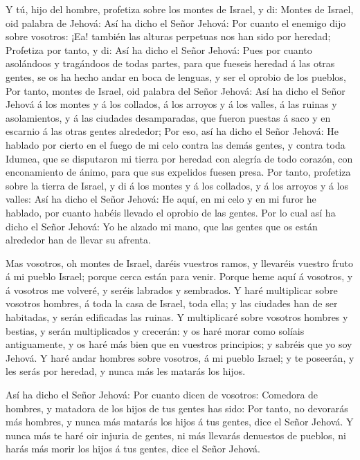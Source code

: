  Y tú, hijo del hombre, profetiza sobre los montes de
Israel, y di: Montes de Israel, oid palabra de Jehová:  Así
ha dicho el Señor Jehová: Por cuanto el enemigo dijo sobre vosotros:
¡Ea! también las alturas perpetuas nos han sido por heredad;
 Profetiza por tanto, y di: Así ha dicho el Señor Jehová:
Pues por cuanto asolándoos y tragándoos de todas partes, para que
fueseis heredad á las otras gentes, se os ha hecho andar en boca de
lenguas, y ser el oprobio de los pueblos,  Por tanto, montes
de Israel, oid palabra del Señor Jehová: Así ha dicho el Señor Jehová á
los montes y á los collados, á los arroyos y á los valles, á las ruinas
y asolamientos, y á las ciudades desamparadas, que fueron puestas á saco
y en escarnio á las otras gentes alrededor;  Por eso, así ha
dicho el Señor Jehová: He hablado por cierto en el fuego de mi celo
contra las demás gentes, y contra toda Idumea, que se disputaron mi
tierra por heredad con alegría de todo corazón, con enconamiento de
ánimo, para que sus expelidos fuesen presa.  Por tanto,
profetiza sobre la tierra de Israel, y di á los montes y á los collados,
y á los arroyos y á los valles: Así ha dicho el Señor Jehová: He aquí,
en mi celo y en mi furor he hablado, por cuanto habéis llevado el
oprobio de las gentes.  Por lo cual así ha dicho el Señor
Jehová: Yo he alzado mi mano, que las gentes que os están alrededor han
de llevar su afrenta.

 Mas vosotros, oh montes de Israel, daréis vuestros ramos, y
llevaréis vuestro fruto á mi pueblo Israel; porque cerca están para
venir.  Porque heme aquí á vosotros, y á vosotros me
volveré, y seréis labrados y sembrados.  Y haré multiplicar
sobre vosotros hombres, á toda la casa de Israel, toda ella; y las
ciudades han de ser habitadas, y serán edificadas las ruinas.
 Y multiplicaré sobre vosotros hombres y bestias, y serán
multiplicados y crecerán: y os haré morar como solíais antiguamente, y
os haré más bien que en vuestros principios; y sabréis que yo soy
Jehová.  Y haré andar hombres sobre vosotros, á mi pueblo
Israel; y te poseerán, y les serás por heredad, y nunca más les matarás
los hijos.

 Así ha dicho el Señor Jehová: Por cuanto dicen de
vosotros: Comedora de hombres, y matadora de los hijos de tus gentes has
sido:  Por tanto, no devorarás más hombres, y nunca más
matarás los hijos á tus gentes, dice el Señor Jehová.  Y
nunca más te haré oir injuria de gentes, ni más llevarás denuestos de
pueblos, ni harás más morir los hijos á tus gentes, dice el Señor
Jehová.

